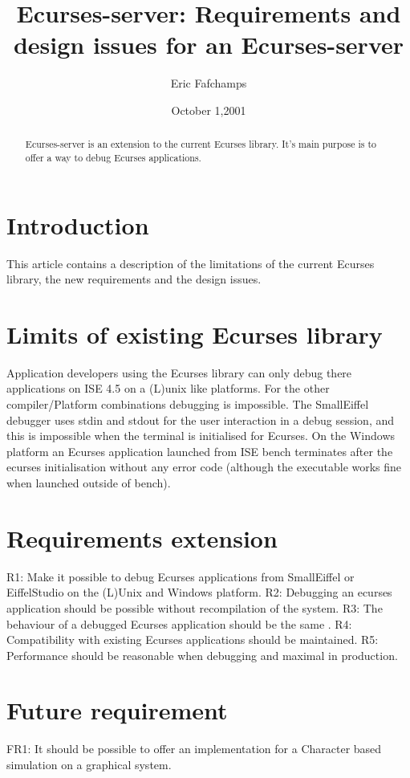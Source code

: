 \documentclass{article}
\begin{document}
\title{Ecurses-server: Requirements and design issues for an Ecurses-server}

\author{Eric Fafchamps}

\date{October 1,2001}

\maketitle
\begin{abstract}
Ecurses-server is an extension to the current Ecurses library. It's main purpose is to offer a way to debug Ecurses applications.
\end{abstract}

\section{Introduction}
This article contains a description of the limitations of the current Ecurses library, the new requirements and the design issues.

\section{Limits of existing Ecurses library}
Application developers using the Ecurses library can only debug there applications on ISE 4.5 on a (L)unix like  platforms. For the other compiler/Platform combinations debugging is impossible. The SmallEiffel debugger uses stdin and stdout for the user interaction in a debug session, and this is impossible when the terminal is initialised for Ecurses. On the Windows platform an Ecurses application launched from ISE bench terminates after the ecurses initialisation without any error code (although the executable works fine when launched outside of bench).

\section{Requirements extension}
R1: Make it possible to debug Ecurses applications from SmallEiffel or EiffelStudio on the (L)Unix and Windows platform.
R2: Debugging an ecurses application should be possible without recompilation of the system. 
R3: The behaviour of a debugged Ecurses application should be the same .
R4: Compatibility with existing Ecurses applications should be maintained. 
R5: Performance should be reasonable when debugging and maximal in production.

\section{Future requirement}
FR1: It should be possible to offer an implementation for a Character based simulation on a graphical system.
\end{document}
